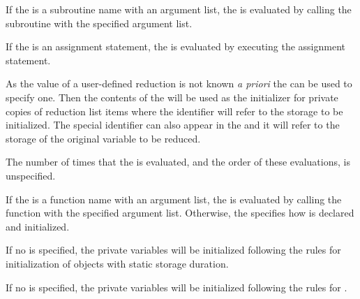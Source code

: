 \begin{fortranspecific}
If the  is a subroutine name with an argument list, the 
 is evaluated by calling the subroutine with the specified argument list.

If the  is an assignment statement, the  is 
evaluated by executing the assignment statement.
\end{fortranspecific}

As the  value of a user-defined reduction is not known 
\emph{a priori} the  can be used to specify one. Then 
the contents of the  will be used as the initializer 
for private copies of reduction list items where the  identifier 
will refer to the storage to be initialized. The special identifier 
 can also appear in the  and it will 
refer to the storage of the  original variable to be reduced.

The number of times that the  is evaluated, and the order 
of these evaluations, is unspecified.

\begin{ccppspecific}
If the  is a function name with an argument list, the 
 is evaluated by calling the function with the specified 
argument list. Otherwise, the  specifies how  
is declared and initialized.
\end{ccppspecific}

\begin{cspecific}
If no  is specified, the private variables will be initialized
following the rules for initialization of objects with static storage duration.
\end{cspecific}

\begin{cppspecific}
If no  is specified, the private variables will be 
initialized following the rules for .
\end{cppspecific}

